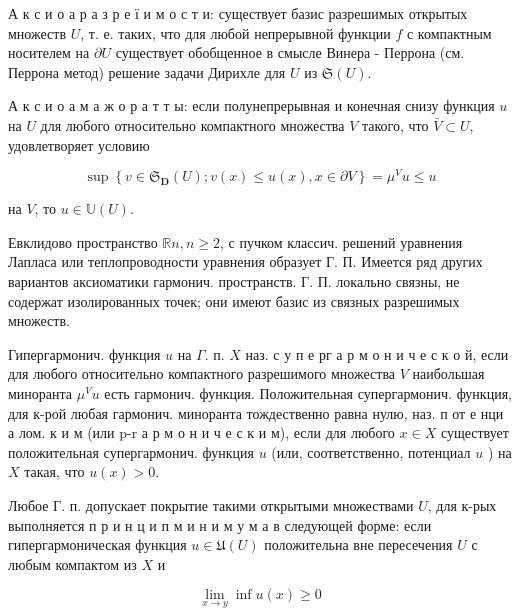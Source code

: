 \documentclass[10pt]{article}
\begin{document}
А к с и о а р а з р е ї и м о с т и: существует базис разрешимых открытых множеств $U$, т. е. таких, что для любой непрерывной функции $f$ с компактным носителем на $\partial U$ существует обобщенное в смысле Винера - Перрона (см. Перрона метод) решение задачи Дирихле для $U$ из $\mathfrak{S}(U)$.



А к с и о а м а ж о р а т т ы: если полунепрерывная и конечная снизу функция $u$ на $U$ для любого относительно компактного множества $V$ такого, что $\bar{V} \subset U$, удовлетворяет условию



\[

\sup \left\{v \in \mathfrak{S}_{\boldsymbol{D}}(U) ; v(x) \leqslant u(x), x \in \partial V\right\}=\mu^{V} u \leqslant u

\]



на $V$, то $u \in \mathbb{U}(U)$.



Евклидово пространство $\mathbb{R} n, n \geqslant 2$, с пучком классич. решений уравнения Лапласа или теплопроводности уравнения образует Г. П. Имеется ряд других вариантов аксиоматики гармонич. пространств. Г. П. локально связны, не содержат изолированных точек; они имеют базис из связных разрешимых множеств.



Гипергармонич. функция $u$ на $\Gamma$. п. $X$ наз. с у п е рг а р м о н и ч е с к о й, если для любого относительно компактного разрешимого множества $V$ наибольшая миноранта $\mu^{V} u$ есть гармонич. функция. Положительная супергармонич. функция, для к-рой любая гармонич. миноранта тождественно равна нулю, наз. п от е нци а лом. к и м (или p-r а р м о н и ч е с к и м), если для любого $x \in X$ существует положительная супергармонич. функция $u$ (или, соответственно, потенциал $u$ ) на $X$ такая, что $u(x)>0$.



Любое Г. п. допускает покрытие такими открытыми множествами $U$, для к-рых выполняется п р и н ц и п м и н и м у м а в следующей форме: если гипергармоническая функция $u \in \mathfrak{U}(U)$ положительна вне пересечения $U$ с любым компактом из $X$ и



\[

\lim _{x \rightarrow y} \inf u(x) \geqslant 0

\]
\end{document}
